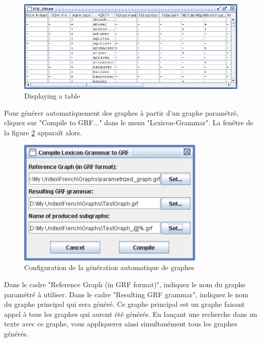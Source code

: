 \begin{figure}[!ht]
\begin{center}
\includegraphics[width=15cm]{resources/img/fig8-6.png}
\caption{Displaying a table\label{fig-table-display}}
\end{center}
\end{figure}

\bigskip
\noindent  Pour générer automatiquement des graphes à partir d’un graphe paramétré, cliquez sur
"Compile to GRF..." dans le menu "Lexicon-Grammar". La fenêtre de la figure
\ref{fig-configuration-graph-generation} apparaît alors.


\begin{figure}[!ht]
\begin{center}
\includegraphics[width=9cm]{resources/img/fig8-7.png}
\caption{Configuration de la génération automatique de graphes\label{fig-configuration-graph-generation}}
\end{center}
\end{figure}

\bigskip
\noindent Dans le cadre "Reference Graph (in GRF format)", indiquez le nom du graphe paramétré
à utiliser. Dans le cadre "Resulting GRF grammar", indiquez le nom du graphe principal qui
sera généré. Ce graphe principal est un graphe faisant appel à tous les graphes qui auront
été générés. En lançant une recherche dans un texte avec ce graphe, vous appliquerez ainsi
simultanément tous les graphes générés.


